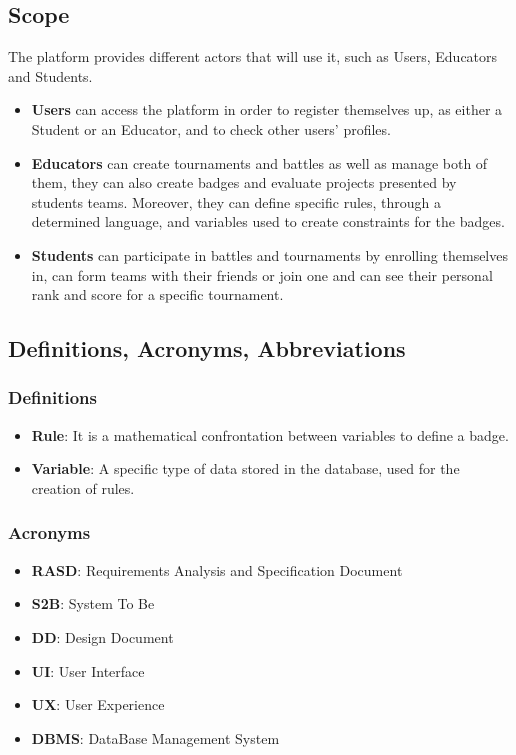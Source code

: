 \documentclass[12pt,oneside,a4paper]{article}
\begin{document}
\subsection{Scope}
The platform provides different actors that will use it, such as Users, Educators and Students.
\begin{itemize}
    \item \textbf{Users} can access the platform in order to register themselves up, as either a Student or an Educator, and to check other users' profiles.
    \item \textbf{Educators} can create tournaments and battles as well as manage both of them, they can also create badges and evaluate projects presented by students teams. Moreover, they can define specific rules, through a determined language, and variables used to create constraints for the badges. 
    \item \textbf{Students} can participate in battles and tournaments by enrolling themselves in, can form teams with their friends or join one and can see their personal rank and score for a specific tournament.
\end{itemize}


\subsection{Definitions, Acronyms, Abbreviations}

\subsubsection{Definitions}
\begin{itemize}
    \item \textbf{Rule}: It is a mathematical confrontation between variables to define a badge.
    \item \textbf{Variable}: A specific type of data stored in the database, used for the creation of rules.
\end{itemize}

\subsubsection{Acronyms}
\begin{itemize}
    \item \textbf{RASD}: Requirements Analysis and Specification Document
    \item \textbf{S2B}: System To Be
    \item \textbf{DD}: Design Document
    \item \textbf{UI}: User Interface
    \item \textbf{UX}: User Experience
    \item \textbf{DBMS}: DataBase Management System
\end{itemize}
\end{document}
